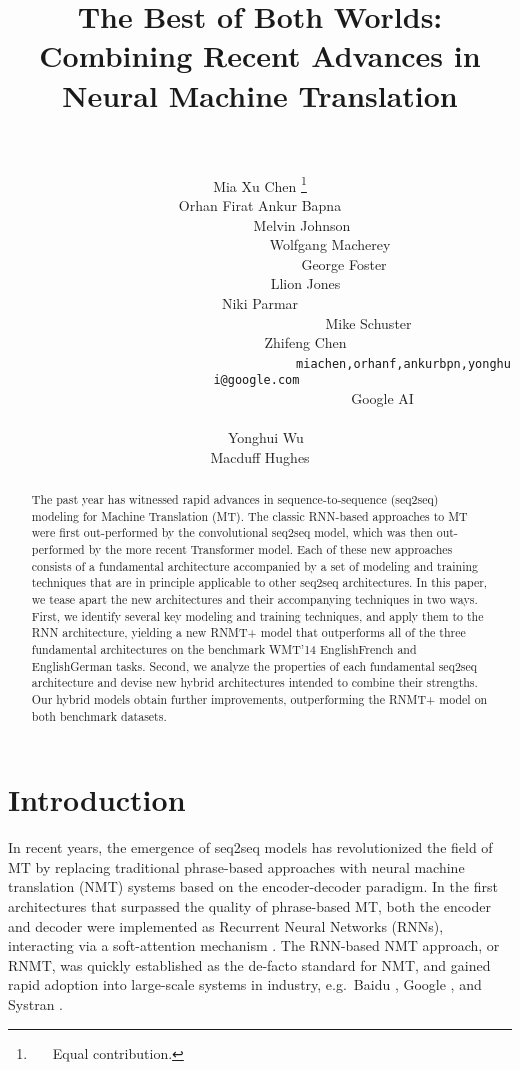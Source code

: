 \documentclass[11pt,a4paper]{article}
\title{The Best of Both Worlds: \\Combining Recent Advances in Neural Machine Translation\\
~}
\author{
Mia Xu Chen \thanks{~~~Equal contribution.}\\\And 
Orhan Firat \samethanks[1] \And 
Ankur Bapna \samethanks[1] \vspace*{-10cm} \\\AND 
~~~~~~~~~~~~Melvin Johnson\\ \And
~~~~~~~~~~~~~~~~~~~~Wolfgang Macherey\\\And 
~~~~~~~~~~~~~~~~~~~~~~~~George Foster\\\And 
~~~~~~~~~~~~~Llion Jones\\\And
 Niki Parmar \\\AND 
~~~~~~~~~~~~~~~~~~~~~~~~~~~~~~~Mike Schuster\\\And
~~~~~~~~~~~~~Zhifeng Chen\vspace{0.2cm}\\
~~~~~~~~~~~~~~~~~~~~~~~~~~~~~~~~~~~~~~~~~{\tt miachen,orhanf,ankurbpn,yonghui@google.com }\vspace{0.2cm}\\
~~~~~~~~~~~~~~~~~~~~~~~~~~~~~~~~~~~Google AI\\
~\\~
\And 
\hspace{-1.2cm} Yonghui Wu\\\And
\hspace{-3.2cm}Macduff Hughes
}
\begin{document}
\maketitle


\begin{abstract}




The past year has witnessed rapid advances in sequence-to-sequence (seq2seq)
modeling for Machine Translation (MT). The classic RNN-based approaches to MT
were first out-performed by the convolutional seq2seq model, which was then
out-performed by the more recent Transformer model. Each of these new
approaches consists of a fundamental architecture accompanied by a set of
modeling and training techniques that are in principle applicable to other
seq2seq architectures. In this paper, we tease apart the new architectures and
their accompanying techniques in two ways. First, we identify several key
modeling and training techniques, and apply them to the RNN architecture,
yielding a new RNMT+ model that outperforms all of the three fundamental architectures
on the benchmark WMT'14 EnglishFrench and
EnglishGerman tasks. Second, we analyze the properties of each
fundamental seq2seq architecture and devise new hybrid architectures intended
to combine their strengths. Our hybrid models obtain further improvements,
outperforming the RNMT+ model on both benchmark datasets.

\end{abstract}

\section{Introduction}

In recent years,  the emergence of seq2seq models \cite{kalchbrenner2013recurrent,sutskever2014sequence,ChoMGBSB14}
has revolutionized the field of MT by replacing traditional phrase-based approaches with
neural machine translation (NMT) systems based on the encoder-decoder paradigm. In the first
architectures that surpassed the quality of phrase-based MT, both
the encoder and decoder were implemented as Recurrent Neural Networks
(RNNs), interacting via a soft-attention mechanism \cite{BahdanauCB15}.
The RNN-based NMT approach, or RNMT, was quickly
established as the de-facto standard for NMT,
and gained rapid adoption into large-scale systems in industry,
e.g.~Baidu \cite{DBLP:journals/corr/ZhouCWLX16},
Google \cite{DBLP:journals/corr/WuSCLNMKCGMKSJL16},
and Systran \cite{DBLP:journals/corr/CregoKKRYSABCDE16}.
\end{document}
